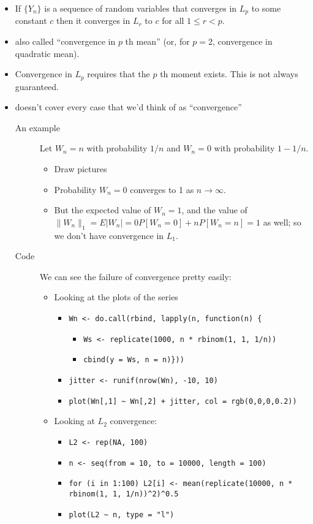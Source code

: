 \begin{itemize}
\item If $\{Y_n\}$ is a sequence of random variables that converges in
        $L_p$ to some constant $c$ then it converges in $L_r$ to $c$ for
        all $1 \leq r < p$.
\item also called ``convergence in $p$ th mean'' (or, for $p = 2$,
        convergence in quadratic mean).
\item Convergence in $L_p$ requires that the $p$ th moment exists.
        This is not always guaranteed.
\item doesn't cover every case that we'd think of as ``convergence''
\begin{description}
\item[An example] Let $W_n = n$ with probability $1/n$ and $W_n = 0$
          with probability $1 - 1/n$.
\begin{itemize}
\item Draw pictures
\item Probability $W_n = 0$ converges to 1 as $n \to \infty$.
\item But the expected value of $W_n = 1$, and the value of $\lVert
            W_n \rVert_1 = E | W_n | = 0 P[W_n = 0] + n P[W_n = n] = 1$
            as well; so we don't have convergence in $L_1$.
\end{itemize}
\item[Code] We can see the failure of convergence pretty easily:
\begin{itemize}
\item Looking at the plots of the series
\begin{itemize}
\item \texttt{Wn <- do.call(rbind, lapply(n, function(n) \{}
\begin{itemize}
\item \texttt{Ws <- replicate(1000, n * rbinom(1, 1, 1/n))}
\item \texttt{cbind(y = Ws, n = n)\}))}
\end{itemize}
\item \texttt{jitter <- runif(nrow(Wn), -10, 10)}
\item \texttt{plot(Wn[,1] \textasciitilde{} Wn[,2] + jitter, col = rgb(0,0,0,0.2))}
\end{itemize}
\item Looking at $L_2$ convergence:
\begin{itemize}
\item \texttt{L2 <- rep(NA, 100)}
\item \texttt{n <- seq(from = 10, to = 10000, length = 100)}
\item \texttt{for (i in 1:100)                  L2[i] <- mean(replicate(10000, n * rbinom(1, 1, 1/n))\textasciicircum{}2)\textasciicircum{}0.5}
\item \texttt{plot(L2 \textasciitilde{} n, type = "l")}
\end{itemize}
\end{itemize}
\end{description}
\end{itemize}
